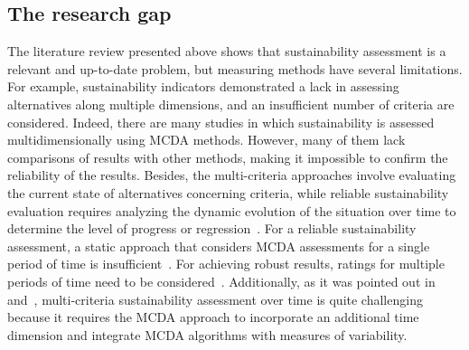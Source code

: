 \documentclass[5p,times]{elsarticle}
\newcounter{example}[section]
\begin{document}
\subsection{The research gap}
The literature review presented above shows that sustainability assessment is a relevant and up-to-date problem, but measuring methods have several limitations. For example, sustainability indicators demonstrated a lack in assessing alternatives along multiple dimensions, and an insufficient number of criteria are considered. Indeed, there are many studies in which sustainability is assessed multidimensionally using MCDA methods. However, many of them lack comparisons of results with other methods, making it impossible to confirm the reliability of the results. Besides, the multi-criteria approaches involve evaluating the current state of alternatives concerning criteria, while reliable sustainability evaluation requires analyzing the dynamic evolution of the situation over time to determine the level of progress or regression~\cite{frini2020temporal}. 
%
For a reliable sustainability assessment, a static approach that considers MCDA assessments for a single period of time is insufficient~\cite{frini2018making}. For achieving robust results, ratings for multiple periods of time need to be considered~\cite{martins2021multidimensional}.
%
Additionally, as it was pointed out in~\cite{banamar2018extension} and~\cite{urli2019promethee}, multi-criteria sustainability assessment over time is quite challenging because it requires the MCDA approach to incorporate an additional time dimension and integrate MCDA algorithms with measures of variability.
\end{document}
